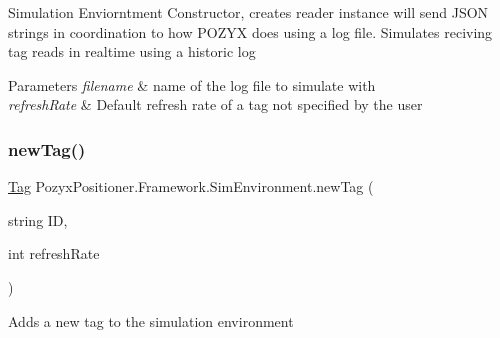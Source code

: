Simulation Enviorntment Constructor, creates reader instance will send J\+S\+ON strings in coordination to how P\+O\+Z\+YX does using a log file. Simulates reciving tag reads in realtime using a historic log 


\begin{DoxyParams}{Parameters}
{\em filename} & name of the log file to simulate with\\
\hline
{\em refresh\+Rate} & Default refresh rate of a tag not specified by the user\\
\hline
\end{DoxyParams}
\mbox{\label{class_pozyx_positioner_1_1_framework_1_1_sim_environment_ad523ae9a258ae7b68d7f966be92ff3bb}} 
\subsubsection{\texorpdfstring{new\+Tag()}{newTag()}\hspace{0.1cm}{\footnotesize\ttfamily [1/2]}}
{\footnotesize\ttfamily \hyperlink{class_pozyx_positioner_1_1_framework_1_1_tag}{Tag} Pozyx\+Positioner.\+Framework.\+Sim\+Environment.\+new\+Tag (\begin{DoxyParamCaption}\item[{string}]{ID,  }\item[{int}]{refresh\+Rate }\end{DoxyParamCaption})}



Adds a new tag to the simulation environment 


